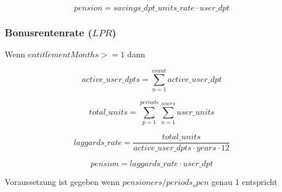 \begin{equation}
	pension = savings\_dpt\_units\_rate \cdot user\_dpt
\end{equation}


\subsubsection*{Bonusrentenrate ($LPR$)}

Wenn $entitlementMonths >= 1$ dann 

\begin{equation*}
	active\_user\_dpts = 
	\sum_{n=1}^{count} active\_user\_dpt
\end{equation*}

\begin{equation*}
	total\_units = 	
	\sum_{p=1}^{periods} \sum_{n=1}^{users} user\_units	
\end{equation*}

\begin{equation*}
	laggards\_rate = 	
	\frac{total\_units} 
	{active\_user\_dpts \cdot years \cdot 12}		
\end{equation*}

\begin{equation*}
	pension = laggards\_rate \cdot user\_dpt
\end{equation*}


Voraussetzung ist gegeben wenn $pensioners / periods_open$ genau 1 entspricht